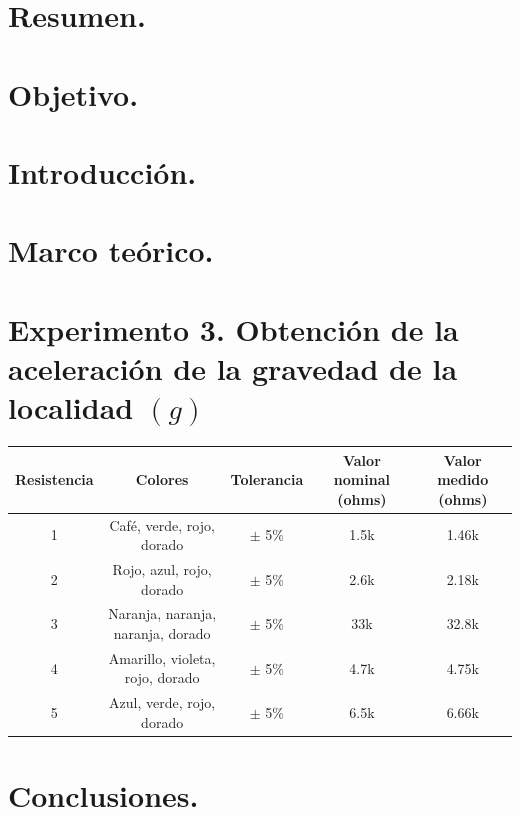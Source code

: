 \documentclass[10pt]{article}
\begin{document}
\tableofcontents
\newpage

\section{Resumen.}


\begin{multicols}{2}

\section{Objetivo.}



\section{Introducción.}



\section{Marco teórico.}

\section{Experimento 3.  Obtención de la aceleración de la gravedad de la localidad $(g)$}


\begin{center}
	\begin{adjustbox}{width=245pt}
		\begin{tabular}{|c|c|c|c|c|}
			\hline
			Resistencia & Colores & Tolerancia & Valor nominal (ohms) & Valor medido (ohms) \\
			\hline
			1 & Café, verde, rojo, dorado & $\pm$ 5\% & 1.5k & 1.46k \\
			\hline
			2 & Rojo, azul, rojo, dorado & $\pm$ 5\% & 2.6k & 2.18k \\
			\hline
			3 & Naranja, naranja, naranja, dorado & $\pm$ 5\% & 33k & 32.8k \\
			\hline
			4 & Amarillo, violeta, rojo, dorado & $\pm$ 5\% & 4.7k & 4.75k \\
			\hline
			5 & Azul, verde, rojo, dorado & $\pm$ 5\% & 6.5k & 6.66k \\
			\hline
		\end{tabular}
	\end{adjustbox}
\end{center}

\section{Conclusiones.}


\end{multicols}
\end{document}
